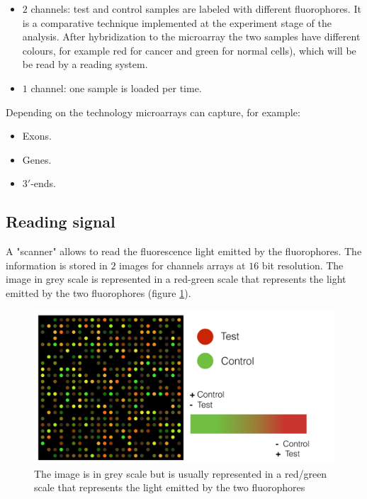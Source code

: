	\begin{multicols}{2}
		\begin{itemize}
			\item $2$ channels: test and control samples are labeled with different fluorophores.
				It is a comparative technique implemented at the experiment stage of the analysis.
				After hybridization to the microarray the two samples have different colours, for example red for cancer and green for normal cells), which will be be read by a reading system.
			\item $1$ channel: one sample is loaded per time.
		\end{itemize}
	\end{multicols}

	Depending on the technology microarrays can capture, for example:

	\begin{multicols}{3}
		\begin{itemize}
			\item Exons.
			\item Genes.
			\item $3'$-ends.
		\end{itemize}
	\end{multicols}

	\subsection{Reading signal}
	A "scanner" allows to read the fluorescence light emitted by the fluorophores.
	The information is stored in $2$ images for channels arrays at $16$ bit resolution.
	The image in grey scale is represented in a red-green scale that represents the light emitted by the two fluorophores (figure \ref{fig:scanner}).

	\begin{figure}[H]
			\centering
			\includegraphics[scale=0.2]{scanner.png}
			\caption{The image is in grey scale but is usually represented in a red/green scale that represents the light emitted by the two fluorophores}
			\label{fig:scanner}
			\end{figure}

